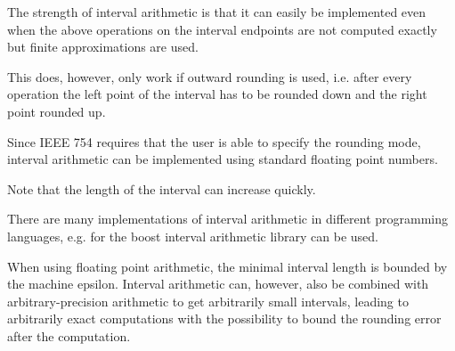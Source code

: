 	The strength of interval arithmetic is that it can easily be implemented even when the above 
	operations on the interval endpoints are not computed exactly but finite approximations are used.
	
	This does, however, only work if outward rounding is used, i.e. 
	after every operation the left point of the interval has to be rounded down and the right point rounded up.

	Since IEEE 754 requires that the user is able to specify the rounding mode, interval arithmetic can be implemented 
	using standard floating point numbers.

	Note that the length of the interval can increase quickly.

	There are many implementations of interval arithmetic in different programming languages, e.g. 
	for \cc the boost interval arithmetic library can be used.

  When using floating point arithmetic, the minimal interval length is bounded
  by the machine epsilon.
  Interval arithmetic can, however, also be combined with arbitrary-precision arithmetic to
  get arbitrarily small intervals, leading to arbitrarily exact computations
  with the possibility to bound the rounding error after the computation.

